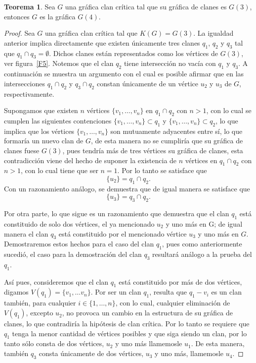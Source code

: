 \documentclass[12pt]{book}
\theoremstyle{definition}
\newtheorem{theorem}{Teorema}[chapter]
\begin{document}
\begin{theorem}\label{T1.12}
Sea $G$ una gráfica clan crítica tal que su gráfica de clanes es $G(3)$, entonces $G$ es la gráfica $G(4)$.
\end{theorem}

\begin{proof}
Sea $G$ una gráfica clan crítica tal que $K(G)=G(3)$. La igualdad anterior implica directamente que existen únicamente tres clanes $q_1$, $q_2$ y $q_3$ tal que $q_1\cap q_3=\emptyset$. Dichos clanes están representados como los vértices de $G(3)$, ver figura~\ref{F5}.
Notemos que el clan $q_2$ tiene intersección no vacía con $q_1$ y $q_3$. A continuación se muestra un argumento con el cual es posible afirmar que en las intersecciones $q_1\cap q_2$ y $q_3\cap q_2$ constan únicamente de un vértice $u_2$ y $u_3$ de $G$, respectivamente.

Supongamos que existen $n$ vértices $\{v_1,\dots,v_n\}$ en $q_1\cap q_2$ con $n>1$, con lo cual se cumplen las siguientes contenciones $\{v_1,\dots,v_n\}\subset q_1 $ y $\{v_1,\dots,v_n\}\subset q_2$, lo que implica que los vértices $\{v_1,\dots,v_n\}$ son mutuamente adyacentes entre sí, lo que formaría un nuevo clan de $G$, de esta manera no se cumpliría que su gráfica de clanes fuese $G(3)$, pues tendría más de tres vértices su gráfica de clanes, esta contradicción viene del hecho de suponer la existencia de $n$ vértices en $q_1\cap q_2$ con $n>1$, con lo cual tiene que ser $n=1$. Por lo tanto se satisface que 
\begin{equation*}
\{u_2\}=q_1\cap q_2.
\end{equation*}
Con un razonamiento análogo, se demuestra que de igual manera se satisface que 
\begin{equation*}
	\{u_3\}=q_3\cap q_2.
\end{equation*}

Por otra parte, lo que sigue es un razonamiento que demuestra que el clan $q_1$ está constituido de solo dos vértices, el ya mencionado $u_2$ y uno más en G; de igual manera el clan $q_3$ está constituido por el mencionado vértice $u_3$ y uno más en $G$. Demostraremos estos hechos para el caso del clan $q_1$, pues como anteriormente sucedió, el caso para la demostración del clan $q_3$ resultará análogo a la prueba del $q_1$. 


Así pues, consideremos que el clan $q_1$ está constituido por más de dos vértices, digamos $V(q_1)=\{v_1,\dots v_n\}$. Por ser un clan $q_1$, resulta que $q_1-v_i$ es un clan también, para cualquier $i\in \{1,\dots,n\}$, con lo cual, cualquier eliminación de $V(q_1)$, excepto $u_2$, no provoca un cambio en la estructura de su gráfica de clanes, lo que contradiría la hipótesis de clan crítica. Por lo tanto se requiere que $q_1$ tenga la menor cantidad de vértices posibles y que siga siendo un clan, por lo tanto sólo consta de dos vértices, $u_2$ y uno más llamemosle $u_1$. De esta manera, también $q_3$ consta únicamente de dos vértices, $u_3$ y uno más, llamemosle $u_4$.


\end{proof}
\end{document}
